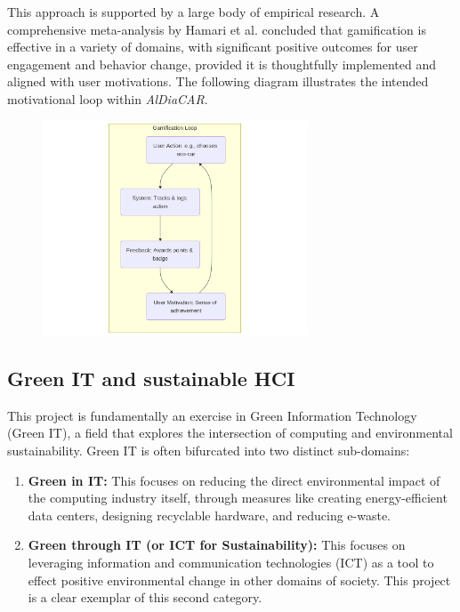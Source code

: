 This approach is supported by a large body of empirical research. A comprehensive meta-analysis by Hamari et al. \cite{hamari2014does} concluded that gamification is effective in a variety of domains, with significant positive outcomes for user engagement and behavior change, provided it is thoughtfully implemented and aligned with user motivations. The following diagram illustrates the intended motivational loop within \textit{AlDiaCAR}.

\begin{figure}[H]
    \centering
    \includegraphics[width=0.7\textwidth]{images/background/gamification-mermaid.png}
\end{figure}

\subsection{Green IT and sustainable HCI}
This project is fundamentally an exercise in Green Information Technology (Green IT), a field that explores the intersection of computing and environmental sustainability. Green IT is often bifurcated into two distinct sub-domains:
\begin{enumerate}
    \item \textbf{Green in IT:} This focuses on reducing the direct environmental impact of the computing industry itself, through measures like creating energy-efficient data centers, designing recyclable hardware, and reducing e-waste.
    \item \textbf{Green through IT (or ICT for Sustainability):} This focuses on leveraging information and communication technologies (ICT) as a tool to effect positive environmental change in other domains of society. This project is a clear exemplar of this second category.
\end{enumerate}

